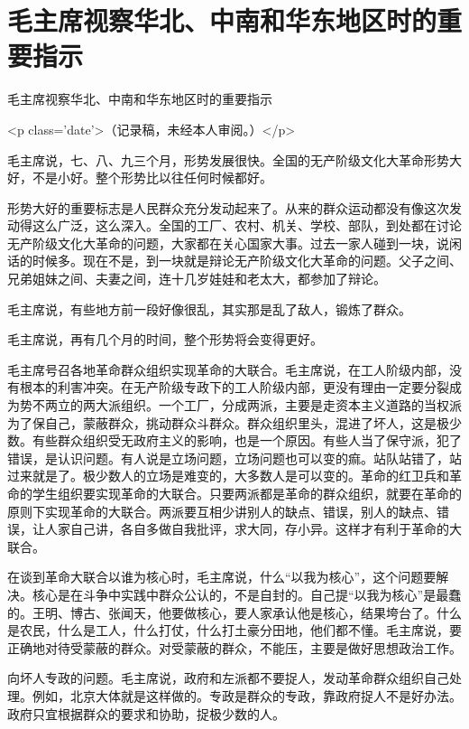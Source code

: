 \section[毛主席视察华北、中南和华东地区时的重要指示 ]{毛主席视察华北、中南和华东地区时的重要指示 }


毛主席视察华北、中南和华东地区时的重要指示

<p class='date'>（记录稿，未经本人审阅。）</p>


毛主席说，七、八、九三个月，形势发展很快。全国的无产阶级文化大革命形势大好，不是小好。整个形势比以往任何时候都好。

形势大好的重要标志是人民群众充分发动起来了。从来的群众运动都没有像这次发动得这么广泛，这么深入。全国的工厂、农村、机关、学校、部队，到处都在讨论无产阶级文化大革命的问题，大家都在关心国家大事。过去一家人碰到一块，说闲话的时候多。现在不是，到一块就是辩论无产阶级文化大革命的问题。父子之间、兄弟姐妹之间、夫妻之间，连十几岁娃娃和老太大，都参加了辩论。

毛主席说，有些地方前一段好像很乱，其实那是乱了敌人，锻炼了群众。

毛主席说，再有几个月的时间，整个形势将会变得更好。

毛主席号召各地革命群众组织实现革命的大联合。毛主席说，在工人阶级内部，没有根本的利害冲突。在无产阶级专政下的工人阶级内部，更没有理由一定要分裂成为势不两立的两大派组织。一个工厂，分成两派，主要是走资本主义道路的当权派为了保自己，蒙蔽群众，挑动群众斗群众。群众组织里头，混进了坏人，这是极少数。有些群众组织受无政府主义的影响，也是一个原因。有些人当了保守派，犯了错误，是认识问题。有人说是立场问题，立场问题也可以变的痲。站队站错了，站过来就是了。极少数人的立场是难变的，大多数人是可以变的。革命的红卫兵和革命的学生组织要实现革命的大联合。只要两派都是革命的群众组织，就要在革命的原则下实现革命的大联合。两派要互相少讲别人的缺点、错误，别人的缺点、错误，让人家自己讲，各自多做自我批评，求大同，存小异。这样才有利于革命的大联合。

在谈到革命大联合以谁为核心时，毛主席说，什么“以我为核心”，这个问题要解决。核心是在斗争中实践中群众公认的，不是自封的。自己提“以我为核心”是最蠢的。王明、博古、张闻天，他要做核心，要人家承认他是核心，结果垮台了。什么是农民，什么是工人，什么打仗，什么打土豪分田地，他们都不懂。毛主席说，要正确地对待受蒙蔽的群众。对受蒙蔽的群众，不能压，主要是做好思想政治工作。

向坏人专政的问题。毛主席说，政府和左派都不要捉人，发动革命群众组织自己处理。例如，北京大体就是这样做的。专政是群众的专政，靠政府捉人不是好办法。政府只宜根据群众的要求和协助，捉极少数的人。

